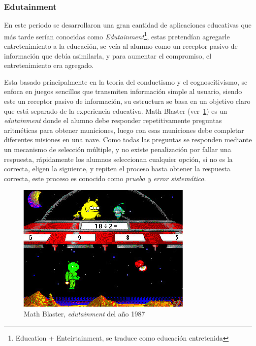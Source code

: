 \subsubsection{Edutainment}

En este periodo se desarrollaron una gran cantidad de aplicaciones educativas
que más tarde serían conocidas como \emph{Edutainment}\footnote{Education +
	Enteirtainment, se traduce como educación entretenida}, estas pretendían
agregarle entretenimiento a la educación, se veía al alumno como un receptor pasivo de
información que debía asimilarla, y para aumentar el compromiso, el
entretenimiento era agregado\cite{resnick:2004}.

Esta basado principalmente en la teoría del conductismo y el cognoscitivismo, se
enfoca en juegos sencillos que transmiten información simple al usuario, siendo
este un receptor pasivo de información, su estructura se basa en un objetivo
claro que está separado de la experiencia educativa\cite{egenfeldt2007third}.
Math Blaster (ver~\ref{fig:math_blaster}) es un \emph{edutainment} donde el
alumno debe responder repetitivamente preguntas aritméticas para obtener
municiones, luego con esas municiones debe completar diferentes misiones en una
nave\cite{bruckman1999can}. Como todas las preguntas se responden mediante un
mecanismo de selección múltiple, y no existe penalización por fallar una
respuesta, rápidamente los alumnos seleccionan cualquier opción, si no es la
correcta, eligen la siguiente, y repiten el proceso hasta obtener la respuesta
correcta, este proceso es conocido como \emph{prueba y error sistemático}. 

\begin{figure}[h!] 
	\centering 
	\includegraphics[scale=0.5,natwidth=296,natheight=217]{tics/math_blaster.jpg}
	\caption{Math Blaster, \emph{edutainment} del año 1987}
	\label{fig:math_blaster} 
\end{figure}

